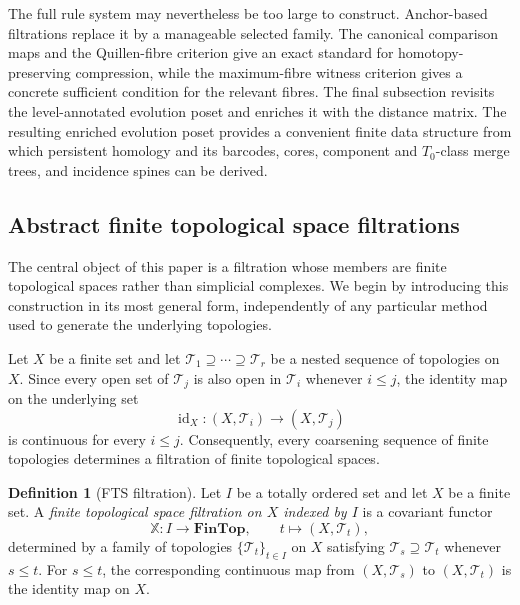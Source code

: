 \documentclass[a4paper,11pt]{article}
\theoremstyle{definition}
\newtheorem{definition}[definition]{Definition}
\theoremstyle{remark}
\DeclareMathOperator{\id}{id}
\begin{document}
The full rule system may nevertheless be too large to construct. Anchor-based filtrations replace it by a manageable selected family. The canonical comparison maps and the Quillen-fibre criterion give an exact standard for homotopy-preserving compression, while the maximum-fibre witness criterion gives a concrete sufficient condition for the relevant fibres. The final subsection revisits the level-annotated evolution poset and enriches it with the distance matrix. The resulting enriched evolution poset provides a convenient finite data structure from which persistent homology and its barcodes, cores, component and $T_0$-class merge trees, and incidence spines can be derived.


\subsection{Abstract finite topological space filtrations}
\label{subsec:abstract-fts}

The central object of this paper is a filtration whose members are finite topological spaces rather than simplicial complexes. We begin by introducing
this construction in its most general form, independently of any particular method used to generate the underlying topologies.

Let $X$ be a finite set and let $\mathcal T_1\supseteq \cdots \supseteq \mathcal T_r$ be a nested sequence of topologies on $X$. Since every open set of $\mathcal T_j$ is also open in $\mathcal T_i$ whenever $i\leq j$, the identity map on the underlying set
$$
\id_X\colon (X,\mathcal T_i)\longrightarrow(X,\mathcal T_j)
$$
is continuous for every $i\leq j$. Consequently, every coarsening sequence of finite topologies determines a filtration of finite topological spaces.

\begin{definition}[FTS filtration]\label{def:fts-filtration}
Let $I$ be a totally ordered set and let $X$ be a finite set. A
\emph{finite topological space filtration on $X$ indexed by $I$} is a covariant functor
$$
\mathbb X\colon I\longrightarrow\mathbf{FinTop},\qquad t\longmapsto (X,\mathcal T_t),
$$
determined by a family of topologies $\{\mathcal T_t\}_{t\in I}$ on $X$ satisfying $\mathcal T_s\supseteq\mathcal T_t$ whenever $s\leq t$. For $s\leq t$, the corresponding continuous map from $(X,\mathcal T_s)$ to $(X,\mathcal T_t)$ is the identity map on $X$.
\end{definition}
\end{document}
